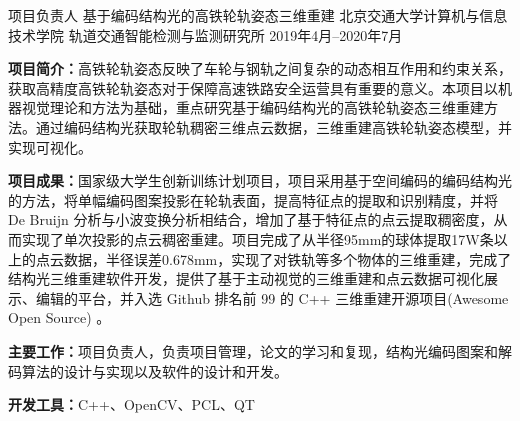 \begin{cventries}
	\cventry
	{项目负责人} %
	{基于编码结构光的高铁轮轨姿态三维重建 \href{http://gjcxcy.bjtu.edu.cn/NewLXItemListForStudentDetail.aspx?ItemNo=594113&year=2020&type=student&IsLXItem=1}{{\color{awesome}\faChain}}
	} %
	{北京交通大学计算机与信息技术学院\newline\vspace{-0.5mm} 轨道交通智能检测与监测研究所} %
	{2019年4月--2020年7月} %
	{
		\begin{cvitems} %
			\item {\textbf{项目简介：}高铁轮轨姿态反映了车轮与钢轨之间复杂的动态相互作用和约束关系，获取高精度高铁轮轨姿态对于保障高速铁路安全运营具有重要的意义。本项目以机器视觉理论和方法为基础，重点研究基于编码结构光的高铁轮轨姿态三维重建方法。通过编码结构光获取轮轨稠密三维点云数据，三维重建高铁轮轨姿态模型，并实现可视化。}
			\item {\textbf{项目成果：}国家级大学生创新训练计划项目，项目采用基于空间编码的编码结构光的方法，将单幅编码图案投影在轮轨表面，提高特征点的提取和识别精度，并将 De Bruijn 分析与小波变换分析相结合，增加了基于特征点的点云提取稠密度，从而实现了单次投影的点云稠密重建。项目完成了从半径95mm的球体提取17W条以上的点云数据，半径误差0.678mm，实现了对铁轨等多个物体的三维重建，完成了结构光三维重建软件开发，提供了基于主动视觉的三维重建和点云数据可视化展示、编辑的平台，并入选 Github 排名前 99 的 C++ 三维重建开源项目(Awesome Open Source) \href{https://github.com/Tang1705/Reconstruction}{{\color{awesome}\faGithub}}}。
			\item {\textbf{主要工作：}项目负责人，负责项目管理，论文的学习和复现，结构光编码图案和解码算法的设计与实现以及软件的设计和开发。}
			\item {\textbf{开发工具：}C++、OpenCV、PCL、QT}
		\end{cvitems}
	}
	
	
	

\end{cventries}
